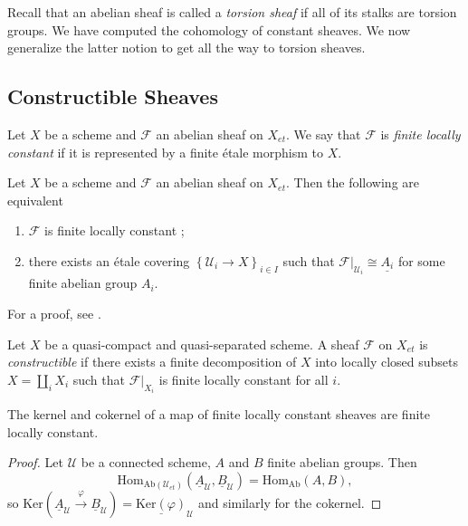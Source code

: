 Recall that an abelian sheaf is called a \emph{torsion sheaf} if all of its stalks are torsion groups. We have computed the cohomology of constant sheaves. We now generalize the latter notion to get all the way to torsion sheaves.

\subsection{Constructible Sheaves}

\begin{definition}
Let $X$ be a scheme and $\mathcal{F}$ an abelian sheaf on $X_{et}$. We say that $\mathcal{F}$ is \emph{finite locally constant} if it is represented by a finite \'etale morphism to $X$. 
\end{definition}

\begin{lemma} \label{lem:CharacterizationOfFiniteLocallyConstant}
Let $X$ be a scheme and $\mathcal{F}$ an abelian sheaf on $X_{et}$. Then the following are equivalent
\begin{enumerate}
\item 
$\mathcal{F}$ is finite locally constant ;
\item 
there exists an \'etale covering $\left\{ \mathcal{U}_i \to X\right\}_{i\in I}$ such that $\mathcal{F}|_{\mathcal{U}_i} \cong \underline{A_i}$ for some finite abelian group $A_i$.
\end{enumerate}
\end{lemma}

For a proof, see \cite{SGA4.5}.

\begin{definition}
Let $X$ be a quasi-compact and quasi-separated scheme. A sheaf $\mathcal{F}$ on $X_{et}$ is \emph{constructible} if there exists a finite decomposition of $X$ into locally closed subsets $X=\coprod_i X_i$ such that $\mathcal{F}|_{X_i}$ is finite locally constant for all $i$.
\end{definition}

\begin{lemma}  \label{lem:KerOfFiniteLocallyConstant}
The kernel and cokernel of a map of finite locally constant sheaves are finite locally constant. 
\end{lemma}

\begin{proof}
Let $\mathcal{U}$ be a connected scheme, $A$ and $B$ finite abelian groups. Then 
$$
\text{Hom}_{\text{Ab}(\mathcal{U}_{et})} \left(\underline A_\mathcal{U}, \underline B_\mathcal{U}\right) = \text{Hom}_{\text{Ab}}(A, B),
$$ 
so $\text{Ker}\left(\underline A_\mathcal{U} \xrightarrow{\varphi} \underline B_\mathcal{U}\right) = \underline{\text{Ker}(\varphi)}_\mathcal{U}$ and similarly for the cokernel. 
\end{proof}

